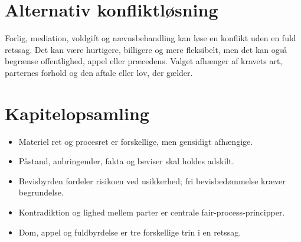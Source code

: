 \section{Alternativ konfliktløsning}

Forlig, mediation, voldgift og nævnsbehandling kan løse en konflikt uden en fuld retssag. Det kan være hurtigere, billigere og mere fleksibelt, men det kan også begrænse offentlighed, appel eller præcedens. Valget afhænger af kravets art, parternes forhold og den aftale eller lov, der gælder.



\section*{Kapitelopsamling}
\begin{itemize}
  \item Materiel ret og procesret er forskellige, men gensidigt afhængige.
  \item Påstand, anbringender, fakta og beviser skal holdes adskilt.
  \item Bevisbyrden fordeler risikoen ved usikkerhed; fri bevisbedømmelse kræver begrundelse.
  \item Kontradiktion og lighed mellem parter er centrale fair-process-principper.
  \item Dom, appel og fuldbyrdelse er tre forskellige trin i en retssag.
\end{itemize}

